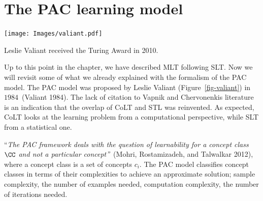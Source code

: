 \documentclass[
  letterpaper,
  12pt,
  british]{tufte-book}
\theoremstyle{plain}
\theoremstyle{definition}
\theoremstyle{plain}
\theoremstyle{remark}
\begin{document}
\hypertarget{the-pac-learning-model}{%
\section{The PAC learning model}\label{the-pac-learning-model}}

\begin{marginfigure}

{\centering \texttt{[image: Images/valiant.pdf]}

}

\caption{\label{fig-valiant}Leslie Valiant received the Turing Award in
2010.}

\end{marginfigure}

Up to this point in the chapter, we have described MLT following {SLT}.
Now we will revisit some of what we already explained with the formalism
of the PAC model. The PAC model was proposed by Leslie Valiant
(Figure~\ref{fig-valiant}) in \(1984\)~(Valiant
1984).
The lack of citation to Vapnik and Chervonenkis literature is an
indication that the overlap of CoLT and STL was reinvented. As expected,
CoLT looks at the learning problem from a computational perspective,
while SLT from a statistical one.

``\emph{The PAC framework deals with the question of learnability for a
concept class \(\CC\) and not a particular concept''}~(Mohri,
Rostamizadeh, and Talwalkar
2012),
where a concept class is a set of concepts \(c_i\). The PAC model
classifies concept classes in terms of their complexities to achieve an
approximate solution; sample complexity, the number of examples needed,
computation complexity, the number of iterations needed.
\end{document}

